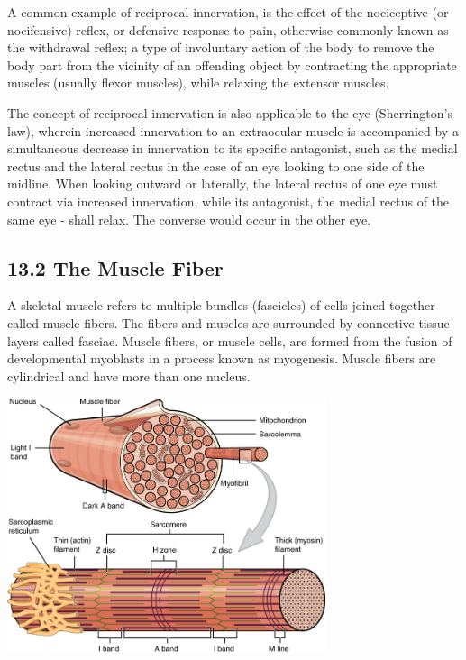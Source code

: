 A common example of reciprocal innervation, is the effect of the
nociceptive (or nocifensive) reflex, or defensive response to pain,
otherwise commonly known as the withdrawal reflex; a type of involuntary
action of the body to remove the body part from the vicinity of an
offending object by contracting the appropriate muscles (usually flexor
muscles), while relaxing the extensor muscles.

The concept of reciprocal innervation is also applicable to the eye
(Sherrington's law), wherein increased innervation to an extraocular
muscle is accompanied by a simultaneous decrease in innervation to its
specific antagonist, such as the medial rectus and the lateral rectus in
the case of an eye looking to one side of the midline. When looking
outward or laterally, the lateral rectus of one eye must contract via
increased innervation, while its antagonist, the medial rectus of the
same eye - shall relax. The converse would occur in the other eye.

\hypertarget{the-muscle-fiber}{%
\subsection{\texorpdfstring{{13.2} The Muscle
Fiber}{13.2 The Muscle Fiber}}\label{the-muscle-fiber}}

A skeletal muscle refers to multiple bundles (fascicles) of cells joined
together called muscle fibers. The fibers and muscles are surrounded by
connective tissue layers called fasciae. Muscle fibers, or muscle cells,
are formed from the fusion of developmental myoblasts in a process known
as myogenesis. Muscle fibers are cylindrical and have more than one
nucleus.

\protect\hypertarget{fig:muscle}{}{}
\includegraphics[width=0.7\textwidth,height=\textheight]{figures/motor/1022_Muscle_Fibers_(small).jpg}

